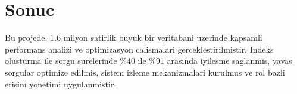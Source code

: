\documentclass[12pt,a4paper]{article}
\begin{document}
\section{Sonuc}
Bu projede, 1.6 milyon satirlik buyuk bir veritabani uzerinde kapsamli performans analizi ve optimizasyon calismalari gerceklestirilmistir. Indeks olusturma ile sorgu surelerinde \%40 ile \%91 arasinda iyilesme saglanmis, yavas sorgular optimize edilmis, sistem izleme mekanizmalari kurulmus ve rol bazli erisim yonetimi uygulanmistir.
\end{document}
